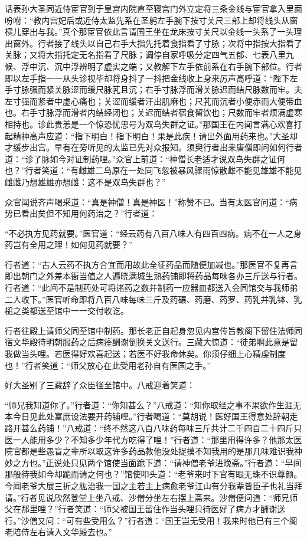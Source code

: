 \documentclass[12pt,UTF8]{ctexbook}
\begin{document}
话表孙大圣同近侍宦官到于皇宫内院直至寝宫门外立定将三条金线与宦官拿入里面吩咐：“教内宫妃后或近侍太监先系在圣躬左手腕下按寸关尺三部上却将线头从窗棂儿穿出与我。”真个那宦官依此言请国王坐在龙床按寸关尺以金线一头系了一头理出窗外。行者接了线头以自己右手大指先托着食指看了寸脉；次将中指按大指看了关脉；又将大指托定无名指看了尺脉；调停自家呼吸分定四气五郁、七表八里九候、浮中沉、沉中浮辨明了虚实之端；又教解下左手依前系在右手腕下部位。行者即以左手指一一从头诊视毕却将身抖了一抖把金线收上身来厉声高呼道：“陛下左手寸脉强而紧关脉涩而缓尺脉芤且沉；右手寸脉浮而滑关脉迟而结尺脉数而牢。夫左寸强而紧者中虚心痛也；关涩而缓者汗出肌麻也；尺芤而沉者小便赤而大便带血也。右手寸脉浮而滑者内结经闭也；关迟而结者宿食留饮也；尺数而牢者烦满虚寒相持也。诊此贵恙是一个惊恐忧思号为双鸟失群之证。”那国王在内闻言满心欢喜打起精神高声应道：“指下明白！指下明白！果是此疾！请出外面用药来也。”大圣却才缓步出宫。早有在旁听见的太监已先对众报知。须臾行者出来唐僧即问如何行者道：“诊了脉如今对证制药哩。”众官上前道：“神僧长老适才说双鸟失群之证何也？”行者笑道：“有雌雄二鸟原在一处同飞忽被暴风骤雨惊散雌不能见雄雄不能见雌雌乃想雄雄亦想雌：这不是双鸟失群也？”

众官闻说齐声喝采道：“真是神僧！真是神医！”称赞不已。当有太医官问道：“病势已看出矣但不知用何药治之？”行者道：

“不必执方见药就要。”医官道：“经云药有八百八味人有四百四病。病不在一人之身药岂有全用之理！如何见药就要？”

行者道：“古人云药不执方合宜而用故此全征药品而随便加减也。”那医官不复再言即出朝门之外差本衙当值之人遍晓满城生熟药铺即将药品每味各办三斤送与行者。行者道：“此间不是制药处可将诸药之数并制药一应器皿都送入会同馆交与我师弟二人收下。”医官听命即将八百八味每味三斤及药碾、药磨、药罗、药乳并乳钵、乳槌之类都送至馆中一一交付收讫。

行者往殿上请师父同至馆中制药。那长老正自起身忽见内宫传旨教阁下留住法师同宿文华殿待明朝服药之后病痊酬谢倒换关文送行。三藏大惊道：“徒弟啊此意是留我做当头哩。若医得好欢喜起送；若医不好我命休矣。你须仔细上心精虔制度也！”行者笑道：“师父放心在此受用老孙自有医国之手。”

好大圣别了三藏辞了众臣径至馆中。八戒迎着笑道：

“师兄我知道你了。”行者道：“你知甚么？”八戒道：“知你取经之事不果欲作生涯无本今日见此处富庶设法要开药铺哩。”行者喝道：“莫胡说！医好国王得意处辞朝走路开甚么药铺！”八戒道：“终不然这八百八味药每味三斤共计二千四百二十四斤只医一人能用多少？不知多少年代方吃得了哩！”行者道：“那里用得许多？他那太医院官都是些愚盲之辈所以取这许多药品教他没处捉摸不知我用的是那几味难识我神妙之方也。”正说处只见两个馆使当面跪下道：“请神僧老爷进晚斋。”行者道：“早间那般待我如今却跪而请之何也？”馆使叩头道：“老爷来时下官有眼无珠不识尊颜。今闻老爷大展三折之肱治我一国之主若主上病愈老爷江山有分我辈皆臣子也礼当拜请。”行者见说欣然登堂上坐八戒、沙僧分坐左右摆上斋来。沙僧便问道：“师兄师父在那里哩？”行者笑道：“师父被国王留住作当头哩只待医好了病方才酬谢送行。”沙僧又问：“可有些受用么？”行者道：“国王岂无受用！我来时他已有三个阁老陪侍左右请入文华殿去也。”
\end{document}

